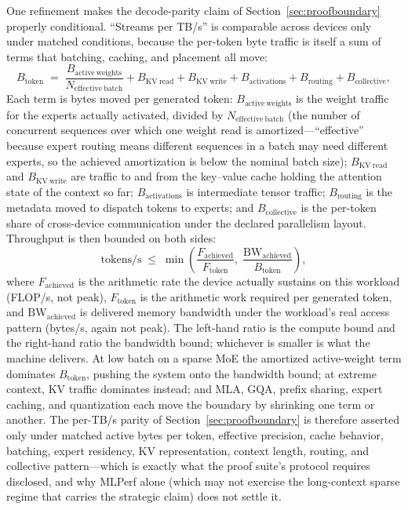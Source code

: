 One refinement makes the decode-parity claim of Section~\ref{sec:proofboundary} properly conditional. ``Streams per TB/s'' is comparable across devices only under matched conditions, because the per-token byte traffic is itself a sum of terms that batching, caching, and placement all move:
\begin{equation}
B_{\mathrm{token}} \;=\; \frac{B_{\mathrm{active\ weights}}}{N_{\mathrm{effective\ batch}}} + B_{\mathrm{KV\ read}} + B_{\mathrm{KV\ write}} + B_{\mathrm{activations}} + B_{\mathrm{routing}} + B_{\mathrm{collective}},
\label{eq:btoken}
\end{equation}
Each term is bytes moved per generated token: $B_{\mathrm{active\ weights}}$ is the weight traffic for the experts actually activated, divided by $N_{\mathrm{effective\ batch}}$ (the number of concurrent sequences over which one weight read is amortized---``effective'' because expert routing means different sequences in a batch may need different experts, so the achieved amortization is below the nominal batch size); $B_{\mathrm{KV\ read}}$ and $B_{\mathrm{KV\ write}}$ are traffic to and from the key--value cache holding the attention state of the context so far; $B_{\mathrm{activations}}$ is intermediate tensor traffic; $B_{\mathrm{routing}}$ is the metadata moved to dispatch tokens to experts; and $B_{\mathrm{collective}}$ is the per-token share of cross-device communication under the declared parallelism layout. Throughput is then bounded on both sides:
\begin{equation}
\mathrm{tokens/s} \;\le\; \min\!\left(\frac{F_{\mathrm{achieved}}}{F_{\mathrm{token}}},\; \frac{\mathrm{BW}_{\mathrm{achieved}}}{B_{\mathrm{token}}}\right),
\label{eq:tokbound}
\end{equation}
where $F_{\mathrm{achieved}}$ is the arithmetic rate the device actually sustains on this workload (FLOP/s, not peak), $F_{\mathrm{token}}$ is the arithmetic work required per generated token, and $\mathrm{BW}_{\mathrm{achieved}}$ is delivered memory bandwidth under the workload's real access pattern (bytes/s, again not peak). The left-hand ratio is the compute bound and the right-hand ratio the bandwidth bound; whichever is smaller is what the machine delivers. At low batch on a sparse MoE the amortized active-weight term dominates $B_{\mathrm{token}}$, pushing the system onto the bandwidth bound; at extreme context, KV traffic dominates instead; and MLA, GQA, prefix sharing, expert caching, and quantization each move the boundary by shrinking one term or another. The per-TB/s parity of Section~\ref{sec:proofboundary} is therefore asserted only under matched active bytes per token, effective precision, cache behavior, batching, expert residency, KV representation, context length, routing, and collective pattern---which is exactly what the proof suite's protocol requires disclosed, and why MLPerf alone (which may not exercise the long-context sparse regime that carries the strategic claim) does not settle it.

